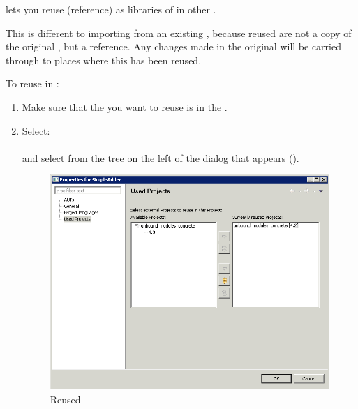 \app{} lets you reuse (reference) \gdprojects{} as libraries of \gdcases{} in other \gdprojects{}. 

This is different to importing \gdcases{} from an existing \gdproject{} , because reused \gdprojects{} are not a copy of the original \gdproject{}, but a reference. Any changes made in the original \gdproject{} will be carried through to places where this \gdproject{} has been reused. 

To reuse \gdprojects{} in \app{}:
\begin{enumerate}
\item Make sure that the \gdproject{} you want to reuse is in the \gddb{}.
\item Select:\\
\\
and select  from the tree on the left of the dialog that appears ().

\begin{figure}[h]
\begin{center}
\includegraphics[width=12.5cm]{Tasks/Projects/PS/reuseproject}
\caption{Reused \gdprojects{}}
\label{reuseproject}
\end{center}
\end{figure}


\end{enumerate}
